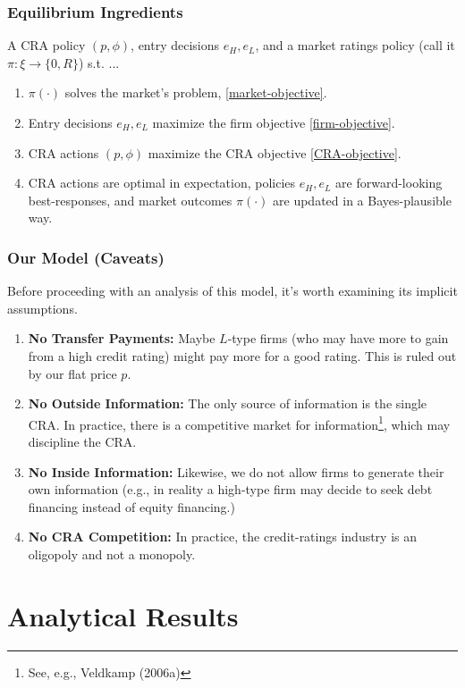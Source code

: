 \documentclass{beamer}
\begin{document}
\begin{frame}
    \frametitle{Equilibrium Ingredients}
    A CRA policy $(p, \phi)$, entry decisions $e_H, e_L$, and a market ratings policy (call it $\pi: \xi \to \{0, R\}$) s.t. ...
    \begin{enumerate}
        \item $\pi(\cdot)$ solves the market's problem, \eqref{market-objective}.
        \item Entry decisions $e_H, e_L$ maximize the firm objective \eqref{firm-objective}.
        \item CRA actions $(p, \phi)$ maximize the CRA objective \eqref{CRA-objective}.
        \item CRA actions are optimal in expectation, policies $e_H, e_L$ are forward-looking best-responses, and market outcomes $\pi(\cdot)$ are updated in a Bayes-plausible way.
    \end{enumerate}
\end{frame}

\begin{frame}
    \frametitle{Our Model (Caveats)}
    Before proceeding with an analysis of this model, it's worth examining its implicit assumptions. 

\begin{enumerate}[<+>]
    \item \textbf{No Transfer Payments:} Maybe $L$-type firms (who may have more to gain from a high credit rating) might pay more for a good rating. This is ruled out by our flat price $p$.
    
    \item \textbf{No Outside Information:} The only source of information is the single CRA. In practice, there is a competitive market for information\footnote{See, e.g., Veldkamp (2006a)}, which may discipline the CRA.
    
    \item \textbf{No Inside Information:} Likewise, we do not allow firms to generate their own information (e.g., in reality a high-type firm may decide to seek debt financing instead of equity financing.)
    
    \item \textbf{No CRA Competition:} In practice, the credit-ratings industry is an oligopoly and not a monopoly.
\end{enumerate}
\end{frame}

\section{Analytical Results}
\end{document}
